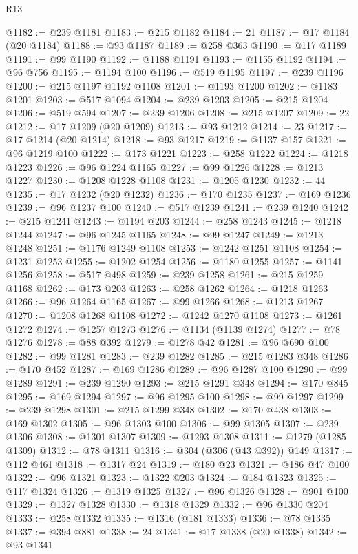\begin{lexlean}{R13}
\begin{coremodule}
@1182 := @239 @1181
@1183 := @215 @1182
@1184 := 21
@1187 := @17 @1184 (@20 @1184)
@1188 := @93 @1187
@1189 := @258 @363
@1190 := @117 @1189
@1191 := @99 @1190
@1192 := @1188 @1191
@1193 := @1155 @1192
@1194 := @96 @756
@1195 := @1194 @100
@1196 := @519 @1195
@1197 := @239 @1196
@1200 := @215 @1197 @1192 @1108
@1201 := @1193 @1200
@1202 := @1183 @1201
@1203 := @517 @1094
@1204 := @239 @1203
@1205 := @215 @1204
@1206 := @519 @594
@1207 := @239 @1206
@1208 := @215 @1207
@1209 := 22
@1212 := @17 @1209 (@20 @1209)
@1213 := @93 @1212
@1214 := 23
@1217 := @17 @1214 (@20 @1214)
@1218 := @93 @1217
@1219 := @1137 @157
@1221 := @96 @1219 @100
@1222 := @173 @1221
@1223 := @258 @1222
@1224 := @1218 @1223
@1226 := @96 @1224 @1165
@1227 := @99 @1226
@1228 := @1213 @1227
@1230 := @1208 @1228 @1108
@1231 := @1205 @1230
@1232 := 44
@1235 := @17 @1232 (@20 @1232)
@1236 := @170 @1235
@1237 := @169 @1236
@1239 := @96 @1237 @100
@1240 := @517 @1239
@1241 := @239 @1240
@1242 := @215 @1241
@1243 := @1194 @203
@1244 := @258 @1243
@1245 := @1218 @1244
@1247 := @96 @1245 @1165
@1248 := @99 @1247
@1249 := @1213 @1248
@1251 := @1176 @1249 @1108
@1253 := @1242 @1251 @1108
@1254 := @1231 @1253
@1255 := @1202 @1254
@1256 := @1180 @1255
@1257 := @1141 @1256
@1258 := @517 @498
@1259 := @239 @1258
@1261 := @215 @1259 @1168
@1262 := @173 @203
@1263 := @258 @1262
@1264 := @1218 @1263
@1266 := @96 @1264 @1165
@1267 := @99 @1266
@1268 := @1213 @1267
@1270 := @1208 @1268 @1108
@1272 := @1242 @1270 @1108
@1273 := @1261 @1272
@1274 := @1257 @1273
@1276 := @1134 (@1139 @1274)
@1277 := @78 @1276
@1278 := @88 @392
@1279 := @1278 @42
@1281 := @96 @690 @100
@1282 := @99 @1281
@1283 := @239 @1282
@1285 := @215 @1283 @348
@1286 := @170 @452
@1287 := @169 @1286
@1289 := @96 @1287 @100
@1290 := @99 @1289
@1291 := @239 @1290
@1293 := @215 @1291 @348
@1294 := @170 @845
@1295 := @169 @1294
@1297 := @96 @1295 @100
@1298 := @99 @1297
@1299 := @239 @1298
@1301 := @215 @1299 @348
@1302 := @170 @438
@1303 := @169 @1302
@1305 := @96 @1303 @100
@1306 := @99 @1305
@1307 := @239 @1306
@1308 := @1301 @1307
@1309 := @1293 @1308
@1311 := @1279 (@1285 @1309)
@1312 := @78 @1311
@1316 := @304 (@306 (@43 @392)) @149
@1317 := @112 @461
@1318 := @1317 @24
@1319 := @180 @23
@1321 := @186 @47 @100
@1322 := @96 @1321
@1323 := @1322 @203
@1324 := @184 @1323
@1325 := @117 @1324
@1326 := @1319 @1325
@1327 := @96 @1326
@1328 := @901 @100
@1329 := @1327 @1328
@1330 := @1318 @1329
@1332 := @96 @1330 @204
@1333 := @258 @1332
@1335 := @1316 (@181 @1333)
@1336 := @78 @1335
@1337 := @394 @881
@1338 := 24
@1341 := @17 @1338 (@20 @1338)
@1342 := @93 @1341

\end{coremodule}
\end{lexlean}
